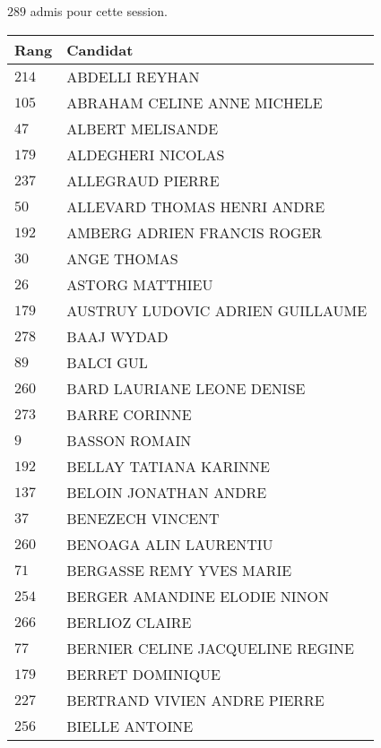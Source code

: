 



  $289$ admis pour cette session.

  \begin{xltabular}{\linewidth}{|l|X|}
    \hline
    \textbf{Rang} & \textbf{Candidat} \\
    \hline
    $214$ & ABDELLI REYHAN \\
    \hline
    $105$ & ABRAHAM CELINE ANNE MICHELE \\
    \hline
    $47$ & ALBERT MELISANDE \\
    \hline
    $179$ & ALDEGHERI NICOLAS \\
    \hline
    $237$ & ALLEGRAUD PIERRE \\
    \hline
    $50$ & ALLEVARD THOMAS HENRI ANDRE \\
    \hline
    $192$ & AMBERG ADRIEN FRANCIS ROGER \\
    \hline
    $30$ & ANGE THOMAS \\
    \hline
    $26$ & ASTORG MATTHIEU \\
    \hline
    $179$ & AUSTRUY LUDOVIC ADRIEN GUILLAUME \\
    \hline
    $278$ & BAAJ WYDAD \\
    \hline
    $89$ & BALCI GUL \\
    \hline
    $260$ & BARD LAURIANE LEONE DENISE \\
    \hline
    $273$ & BARRE CORINNE \\
    \hline
    $9$ & BASSON ROMAIN \\
    \hline
    $192$ & BELLAY TATIANA KARINNE \\
    \hline
    $137$ & BELOIN JONATHAN ANDRE \\
    \hline
    $37$ & BENEZECH VINCENT \\
    \hline
    $260$ & BENOAGA ALIN LAURENTIU \\
    \hline
    $71$ & BERGASSE REMY YVES MARIE \\
    \hline
    $254$ & BERGER AMANDINE ELODIE NINON \\
    \hline
    $266$ & BERLIOZ CLAIRE \\
    \hline
    $77$ & BERNIER CELINE JACQUELINE REGINE \\
    \hline
    $179$ & BERRET DOMINIQUE \\
    \hline
    $227$ & BERTRAND VIVIEN ANDRE PIERRE \\
    \hline
    $256$ & BIELLE ANTOINE \\

\end{xltabular}

